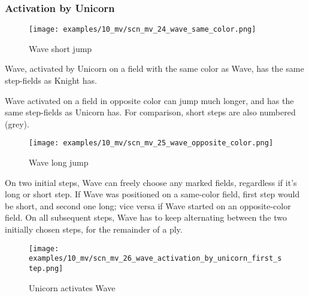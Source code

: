 \subsubsection*{Activation by Unicorn}

\vspace*{-0.7\baselineskip}
\noindent
\begin{wrapfigure}[10]{l}{0.45\textwidth}
\centering
\texttt{[image: examples/10\_mv/scn\_mv\_24\_wave\_same\_color.png]}
\vspace*{-0.3\baselineskip}
\caption{Wave short jump}
\label{fig:scn_mv_24_wave_same_color}
\end{wrapfigure}
Wave, activated by Unicorn on a field with the same color as Wave, has the same step-fields
as Knight has.

Wave activated on a field in opposite color can jump much longer, and has the same step-fields
as Unicorn has. For comparison, short steps are also numbered (grey).

\vspace*{0.7\baselineskip}
\noindent
\begin{wrapfigure}[18]{l}{0.7\textwidth}
\centering
\texttt{[image: examples/10\_mv/scn\_mv\_25\_wave\_opposite\_color.png]}
\vspace*{-0.3\baselineskip}
\caption{Wave long jump}
\label{fig:scn_mv_25_wave_opposite_color}
\end{wrapfigure}
On two initial steps, Wave can freely choose any marked fields, regardless if it's long or short step.
If Wave was positioned on a same-color field, first step would be short, and second one long; vice versa
if Wave started on an opposite-color field. On all subsequent steps, Wave has to keep alternating between
the two initially chosen steps, for the remainder of a ply.

\clearpage %

\vspace*{-2.1\baselineskip}
\noindent
\begin{figure}[!h]
\texttt{[image: examples/10\_mv/scn\_mv\_26\_wave\_activation\_by\_unicorn\_first\_step.png]}
\vspace*{-1.3\baselineskip}
\caption{Unicorn activates Wave}
\label{fig:scn_mv_26_wave_activation_by_unicorn_first_step}
\end{figure}

